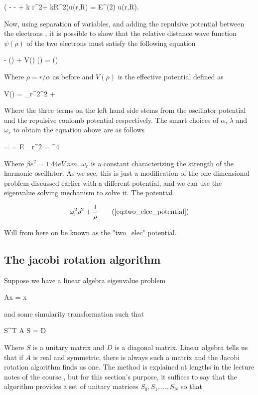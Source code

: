 \documentclass[a4paper,10pt,english]{article}
\numberwithin{figure}{subsection}
\numberwithin{table}{subsection}
\numberwithin{equation}{subsection}
\begin{document}
\eqs \left(  -  - +  k r^2+  kR^2\right)u(r,R)  = E^{(2)} u(r,R).
\eqf

Now, using separation of variables, 
and adding the repulsive potential between the electrons 
, it is possible to show that the relative distance
wave function $\psi(\rho)$ of the two electrons must satisfy the following equation

\eqs
- \psi(\rho) + V(\rho) \psi(\rho) = \lambda \psi(\rho)
\eqf

Where $\rho = r/\alpha$ as before and $V(\rho)$ is the effective potential defined as 

\eqs V(\rho) = \omega_r^2\rho^2 +   
\label{eq:two_elec_potential} \eqf

Where the three terms on the left hand side stems from the oscillator potential and 
the repulsive coulomb potential  respectively. 
The smart choices of $\alpha$, $\lambda$ and $\omega_r$ to obtain the equation above are as follows

\eqs \alpha =  \eqf
\eqs \lambda =  E \eqf
\eqs \omega_r^2 =   \alpha^4 \eqf

Where $\beta e^2 = 1.44 eV~ nm$. 
$\omega_r$ is a constant characterizing the strength of the harmonic oscillator. 
As we see, this is just a modification of the one dimensional problem discussed earlier
with a different potential, 
and we can use the eigenvalue solving mechanism to solve it.
The potential 

\begin{equation}
\omega_r^2\rho^2 + \frac{1}{\rho} \tag{\ref{eq:two_elec_potential}} 
\end{equation}

Will from here on be known as the "two\_elec" potential. 

\subsection{The jacobi rotation algorithm}\label{sec:jacobi}

Suppose we have a linear algebra eigenvalue problem

\eqs A\vec x = \lambda \vec x \eqf

and some simularity transformation such that 

\eqs S^T A S = D \eqf

Where $S$ is a unitary matrix and $D$ is a diagonal matrix. 
Linear algebra tells us that if $A$ is real and symmetric, there is always such a matrix 
and the Jacobi rotation algorithm finds us one. 
The method is explained at lengths in the lecture notes of the course \cite{lecturenotes}, 
but for this section's purpose, it suffices to say that the algorithm provides 
a set of unitary matrices $S_0,S_1,...,S_N$
so that 
\end{document}
